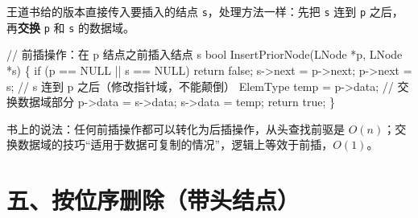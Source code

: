 \documentclass[10.5pt,a4paper,oneside]{article}
\newcommand{\tocback}{\par\vspace{-3pt}{\hfill\footnotesize\hyperlink{toc}{\textcolor{wdgray}{\ensuremath{\uparrow}\,回到目录}}}\par\vspace{-4pt}}
\newenvironment{Shaded}{}{}
\newcommand{\CommentTok}[1]{\textcolor[rgb]{0.18,0.55,0.23}{#1}}
\newcommand{\ControlFlowTok}[1]{\textcolor[rgb]{0.12,0.31,0.71}{#1}}
\newcommand{\DataTypeTok}[1]{\textcolor[rgb]{0.12,0.31,0.71}{#1}}
\newcommand{\KeywordTok}[1]{\textcolor[rgb]{0.12,0.31,0.71}{#1}}
\newcommand{\NormalTok}[1]{#1}
\newcommand{\OperatorTok}[1]{\textcolor[rgb]{0.20,0.20,0.20}{#1}}
\begin{document}
\begin{bookbox}

王道书给的版本直接传入要插入的结点 \texttt{s}，处理方法一样：先把
\texttt{s} 连到 \texttt{p} 之后，再\textbf{交换} \texttt{p} 和
\texttt{s} 的数据域。

\begin{Shaded}
\begin{Highlighting}[]
\CommentTok{// 前插操作：在 p 结点之前插入结点 s}
\DataTypeTok{bool}\NormalTok{ InsertPriorNode}\OperatorTok{(}\NormalTok{LNode }\OperatorTok{*}\NormalTok{p}\OperatorTok{,}\NormalTok{ LNode }\OperatorTok{*}\NormalTok{s}\OperatorTok{)} \OperatorTok{\{}
    \ControlFlowTok{if} \OperatorTok{(}\NormalTok{p }\OperatorTok{==}\NormalTok{ NULL }\OperatorTok{||}\NormalTok{ s }\OperatorTok{==}\NormalTok{ NULL}\OperatorTok{)}
        \ControlFlowTok{return} \KeywordTok{false}\OperatorTok{;}
\NormalTok{    s}\OperatorTok{{-}\textgreater{}}\NormalTok{next }\OperatorTok{=}\NormalTok{ p}\OperatorTok{{-}\textgreater{}}\NormalTok{next}\OperatorTok{;}
\NormalTok{    p}\OperatorTok{{-}\textgreater{}}\NormalTok{next }\OperatorTok{=}\NormalTok{ s}\OperatorTok{;}              \CommentTok{// s 连到 p 之后（修改指针域，不能颠倒）}
\NormalTok{    ElemType temp }\OperatorTok{=}\NormalTok{ p}\OperatorTok{{-}\textgreater{}}\NormalTok{data}\OperatorTok{;}  \CommentTok{// 交换数据域部分}
\NormalTok{    p}\OperatorTok{{-}\textgreater{}}\NormalTok{data }\OperatorTok{=}\NormalTok{ s}\OperatorTok{{-}\textgreater{}}\NormalTok{data}\OperatorTok{;}
\NormalTok{    s}\OperatorTok{{-}\textgreater{}}\NormalTok{data }\OperatorTok{=}\NormalTok{ temp}\OperatorTok{;}
    \ControlFlowTok{return} \KeywordTok{true}\OperatorTok{;}
\OperatorTok{\}}
\end{Highlighting}
\end{Shaded}

书上的说法：任何前插操作都可以转化为后插操作，从头查找前驱是
\(O(n)\)；交换数据域的技巧“适用于数据可复制的情况”，逻辑上等效于前插，\(O(1)\)。

\end{bookbox}

\hypertarget{ux4e94ux6309ux4f4dux5e8fux5220ux9664ux5e26ux5934ux7ed3ux70b9}{%
\section{五、按位序删除（带头结点）}\label{ux4e94ux6309ux4f4dux5e8fux5220ux9664ux5e26ux5934ux7ed3ux70b9}}

\tocback

\end{document}
